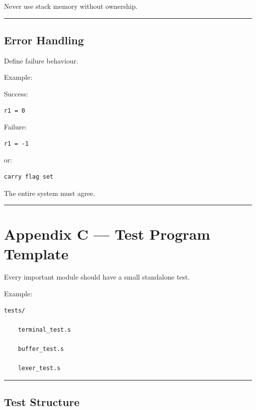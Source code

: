 \documentclass[
  oneside,
  openany]{book}
\begin{document}
Never use stack memory without ownership.

\begin{center}\rule{0.5\linewidth}{0.5pt}\end{center}

\hypertarget{error-handling}{%
\section{Error Handling}\label{error-handling}}

Define failure behaviour.

Example:

Success:

\begin{verbatim}
r1 = 0
\end{verbatim}

Failure:

\begin{verbatim}
r1 = -1
\end{verbatim}

or:

\begin{verbatim}
carry flag set
\end{verbatim}

The entire system must agree.

\begin{center}\rule{0.5\linewidth}{0.5pt}\end{center}

\hypertarget{appendix-c-test-program-template}{%
\chapter{Appendix C --- Test Program
Template}\label{appendix-c-test-program-template}}

Every important module should have a small standalone test.

Example:

\begin{verbatim}
tests/

    terminal_test.s

    buffer_test.s

    lexer_test.s
\end{verbatim}

\begin{center}\rule{0.5\linewidth}{0.5pt}\end{center}

\hypertarget{test-structure}{%
\section{Test Structure}\label{test-structure}}
\end{document}
